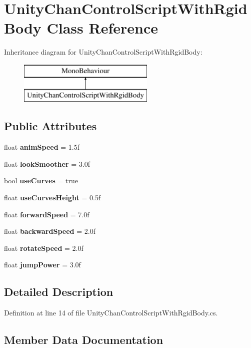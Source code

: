 \section{Unity\+Chan\+Control\+Script\+With\+Rgid\+Body Class Reference}
\label{class_unity_chan_control_script_with_rgid_body}
Inheritance diagram for Unity\+Chan\+Control\+Script\+With\+Rgid\+Body\+:\begin{figure}[H]
\begin{center}
\leavevmode
\includegraphics[height=2.000000cm]{class_unity_chan_control_script_with_rgid_body}
\end{center}
\end{figure}
\subsection*{Public Attributes}
\begin{DoxyCompactItemize}
\item 
float \textbf{ anim\+Speed} = 1.\+5f
\item 
float \textbf{ look\+Smoother} = 3.\+0f
\item 
bool \textbf{ use\+Curves} = true
\item 
float \textbf{ use\+Curves\+Height} = 0.\+5f
\item 
float \textbf{ forward\+Speed} = 7.\+0f
\item 
float \textbf{ backward\+Speed} = 2.\+0f
\item 
float \textbf{ rotate\+Speed} = 2.\+0f
\item 
float \textbf{ jump\+Power} = 3.\+0f
\end{DoxyCompactItemize}


\subsection{Detailed Description}


Definition at line 14 of file Unity\+Chan\+Control\+Script\+With\+Rgid\+Body.\+cs.



\subsection{Member Data Documentation}
\mbox{\label{class_unity_chan_control_script_with_rgid_body_ae3dfca305847bcfcb0d796e1dd690e9e}} 
